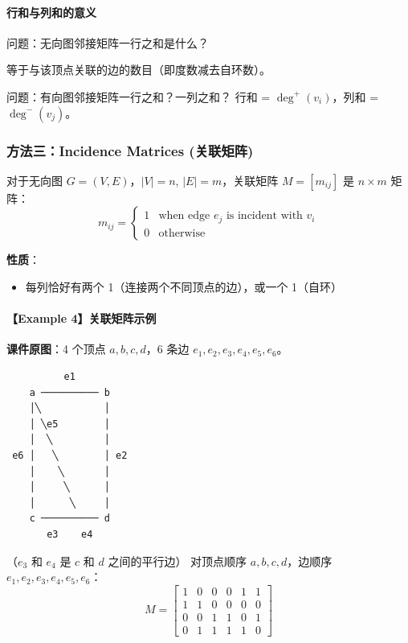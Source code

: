 \documentclass[10pt,a4paper,openany]{ctexbook}
\theoremstyle{definition}
\theoremstyle{remark}
\renewenvironment{quote}
  {\list{}{\leftmargin=1em\rightmargin=0pt\topsep=0.5pt\partopsep=0pt}\item[]}
  {\endlist}
\begin{document}
\paragraph{行和与列和的意义}

问题：无向图邻接矩阵一行之和是什么？
\begin{quote}
等于与该顶点关联的边的数目（即度数减去自环数）。

问题：有向图邻接矩阵一行之和？一列之和？
行和 = $\deg^+(v_i)$，列和 = $\deg^-(v_j)$。

\end{quote}
\vspace{-2pt}

\subsubsection{方法三：Incidence Matrices (关联矩阵)}

对于无向图 $G = (V, E)$，$|V| = n$, $|E| = m$，关联矩阵 $M = [m_{ij}]$ 是 $n \times m$ 矩阵：
\[
m_{ij} = 
\begin{cases}
1 & \text{when edge } e_j \text{ is incident with } v_i \\
0 & \text{otherwise}
\end{cases}
\]

\textbf{性质}：
\begin{itemize}
\item 每列恰好有两个 1（连接两个不同顶点的边），或一个 1（自环）

\end{itemize}

\paragraph{【Example 4】关联矩阵示例}

\textbf{课件原图}：4 个顶点 $a, b, c, d$，6 条边 $e_1, e_2, e_3, e_4, e_5, e_6$。
{\footnotesize\begin{verbatim}
          e1
    a ────────── b
    │╲           │
    │ ╲e5        │
    │  ╲         │
 e6 │   ╲        │ e2
    │    ╲       │
    │     ╲      │
    │      ╲     │
    c ────────── d
       e3    e4
\end{verbatim}}

（$e_3$ 和 $e_4$ 是 $c$ 和 $d$ 之间的平行边）
对顶点顺序 $a, b, c, d$，边顺序 $e_1, e_2, e_3, e_4, e_5, e_6$：
\[
M =
\begin{bmatrix}
1 & 0 & 0 & 0 & 1 & 1 \\
1 & 1 & 0 & 0 & 0 & 0 \\
0 & 0 & 1 & 1 & 0 & 1 \\
0 & 1 & 1 & 1 & 1 & 0
\end{bmatrix}
\]
\end{document}
